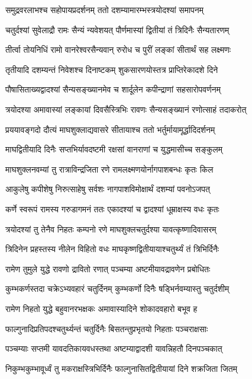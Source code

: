 \twolineshloka
{समुद्रवरलाभश्च सहोपायप्रदर्शनम्}
{ततो दशम्यामारम्भस्त्रयोदश्यां समापनम्}%

\twolineshloka
{चतुर्दश्यां सुवेलाद्रौ रामः सैन्यं न्यवेशयत्}
{पौर्णमास्यां द्वितीयां तं त्रिदिनैः सैन्यतारणम्}%

\twolineshloka
{तीर्त्वा तोयनिधिं रामो वानरेश्वरसैन्यवान्}
{रुरोध च पुरीं लङ्कां सीतार्थं सह लक्ष्मणः}%

\twolineshloka
{तृतीयादि दशम्यन्तं निवेशश्च दिनाष्टकम्}
{शुकसारणयोस्तत्र प्राप्तिरेकादशे दिने}%

\twolineshloka
{पौषासिताख्यद्वादश्यां सैन्यसङ्ख्यानमेव च}
{शार्दूलेन कपीन्द्राणां सहसारोपवर्णनम्}%

\twolineshloka
{त्रयोदश्या अमावास्यां लङ्कायां दिवसैस्त्रिभिः}
{रावणः सैन्यसङ्ख्यानं रणोत्साहं तदाकरोत्}%

\twolineshloka
{प्रययावङ्गदो दौत्यं माघशुक्लाद्यवासरे}
{सीतायाश्च ततो भर्तुर्मायामूर्द्धादिदर्शनम्}%

\twolineshloka
{माघद्वितीयादि दिनैः सप्तभिर्यावदष्टमी}
{रक्षसां वानराणां च युद्धमासीच्च सङ्कुलम्}%

\twolineshloka
{माघशुक्लनवम्यां तु रात्राविन्द्रजिता रणे}
{रामलक्ष्मणयोर्नागपाशबन्धः कृतः किल}%

\twolineshloka
{आकुलेषु कपीशेषु निरुत्साहेषु सर्वशः}
{नागपाशविमोक्षार्थं दशम्यां पवनोऽजपत्}%

\twolineshloka
{कर्णे स्वरूपं रामस्य गरुडागमनं ततः}
{एकादश्यां च द्वादश्यां धूम्राक्षस्य वधः कृतः}%

\twolineshloka
{त्रयोदश्यां तु तेनैव निहतः कम्पनो रणे}
{माघशुक्लचतुर्दश्या यावत्कृष्णादिवासरम्}%

\twolineshloka
{त्रिदिनेन प्रहस्तस्य नीलेन विहितो वधः}
{माघकृष्णद्वितीयायाश्चतुर्थ्यं तं त्रिभिर्दिनैः}%

\twolineshloka
{रामेण तुमुले युद्धे रावणो द्रावितो रणात्}
{पञ्चम्या अष्टमीयावद्रावणेन प्रबोधितः}%

\twolineshloka
{कुम्भकर्णस्तदा चक्रेऽभ्यवहारं चतुर्दिनम्}
{कुम्भकर्णो दिनैः षड्भिर्नवम्यास्तु चतुर्दशीम्}%

\twolineshloka
{रामेण निहतो युद्धे बहुवानरभक्षकः}
{अमावास्यादिने शोकादवहारो बभूव ह}%

\twolineshloka
{फाल्गुनादिप्रतिपदश्चतुर्थ्यन्तं चतुर्दिनैः}
{बिसतन्तुप्रभृतयो निहताः पञ्चराक्षसाः}%

\twolineshloka
{पञ्चम्याः सप्तमी यावदतिकायवधस्तथा}
{अष्टम्याद्वादशी यावन्निहतौ दिनपञ्चकात्}%

\twolineshloka
{निकुम्भकुम्भावूर्ध्वं तु मकराक्षस्त्रिभिर्दिनैः}
{फाल्गुनासितद्वितीयायां दिने शक्रजिता जितम्}%

